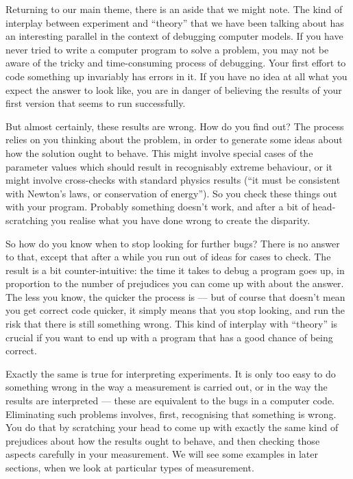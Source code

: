   Returning to our main theme, there is an aside that we might note. The kind 
  of interplay between experiment and “theory” that we have been talking about 
  has an interesting parallel in the context of debugging computer models. If 
  you have never tried to write a computer program to solve a problem, you may 
  not be aware of the tricky and time-consuming process of debugging. Your 
  first effort to code something up invariably has errors in it. If you have no 
  idea at all what you expect the answer to look like, you are in danger of 
  believing the results of your first version that seems to run successfully. 

  But almost certainly, these results are wrong. How do you find out? The 
  process relies on you thinking about the problem, in order to generate some 
  ideas about how the solution ought to behave. This might involve special 
  cases of the parameter values which should result in recognisably extreme 
  behaviour, or it might involve cross-checks with standard physics results 
  (“it must be consistent with Newton’s laws, or conservation of energy”). So 
  you check these things out with your program. Probably something doesn’t 
  work, and after a bit of head-scratching you realise what you have done wrong 
  to create the disparity. 

  So how do you know when to stop looking for further bugs? There is no answer 
  to that, except that after a while you run out of ideas for cases to check. 
  The result is a bit counter-intuitive: the time it takes to debug a program 
  goes up, in proportion to the number of prejudices you can come up with about 
  the answer. The less you know, the quicker the process is — but of course 
  that doesn’t mean you get correct code quicker, it simply means that you stop 
  looking, and run the risk that there is still something wrong. This kind of 
  interplay with “theory” is crucial if you want to end up with a program that 
  has a good chance of being correct. 

  Exactly the same is true for interpreting experiments. It is only too easy to 
  do something wrong in the way a measurement is carried out, or in the way the 
  results are interpreted — these are equivalent to the bugs in a computer 
  code. Eliminating such problems involves, first, recognising that something 
  is wrong. You do that by scratching your head to come up with exactly the 
  same kind of prejudices about how the results ought to behave, and then 
  checking those aspects carefully in your measurement. We will see some 
  examples in later sections, when we look at particular types of measurement. 

